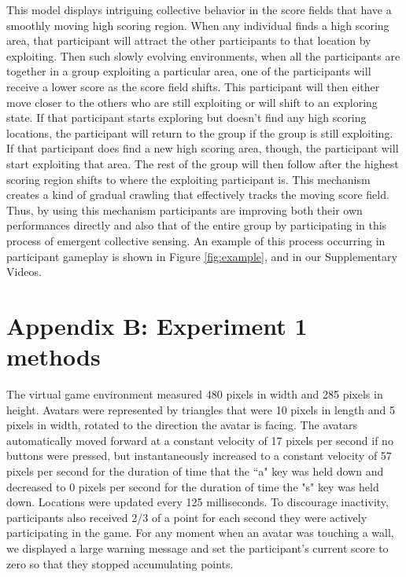 \documentclass[12pt,letterpaper]{article}
\begin{document}
This model displays intriguing collective behavior in the score fields that have a smoothly moving high scoring region.
When any individual finds a high scoring area, that participant will attract the
other participants to that location by exploiting.  Then such slowly evolving environments, when all the
participants are together in a group exploiting a particular area, one of
the participants will receive a lower score as the score field shifts.  This
participant will then either move closer to the others who are still
exploiting or will shift to an exploring state.  If that participant starts
exploring but doesn't find any high scoring locations, the participant will return
to the group if the group is still exploiting.  If that participant does
find a new high scoring area, though, the participant will start exploiting that
area.  The rest of the group will then follow after the highest
scoring region shifts to where the exploiting participant is.  This
mechanism creates a kind of gradual crawling that effectively tracks
the moving score field.  Thus, by using this mechanism participants are
improving both their own performances directly and also that of the
entire group by participating in this process of emergent collective
sensing.  An example of this process occurring in participant gameplay
is shown in Figure \ref{fig:example}, and in our Supplementary Videos.

\section*{Appendix B: Experiment 1 methods}

The virtual game environment measured 480 pixels in width and 285 pixels in height.
Avatars were represented by triangles that were 10 pixels in length and 5 pixels in width, rotated to the direction the avatar is facing. 
The avatars automatically moved forward at a constant velocity of 17 pixels per second if no buttons were pressed, but instantaneously increased to a constant velocity of 57 pixels per second for the duration of time that the ``a" key was held down and decreased to 0 pixels per second for the duration of time the "s" key was held down. 
Locations were updated every 125 milliseconds.
To discourage inactivity, participants also received 2/3 of a point for each second they were actively participating in the game.
For any moment when an avatar was touching a wall, we displayed a large warning message and set the participant's current score to zero so that they stopped accumulating points.
\end{document}
